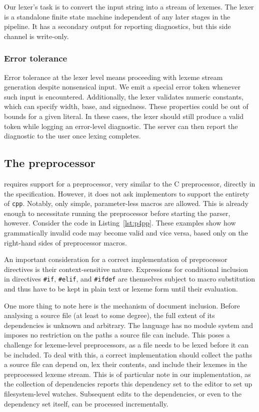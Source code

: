 Our lexer's task is to convert the input string into a stream of lexemes. The
lexer is a standalone finite state machine independent of any later stages in
the pipeline. It has a secondary output for reporting diagnostics, but this side
channel is write-only.

\subsubsection*{Error tolerance}

Error tolerance at the lexer level means proceeding with lexeme stream
generation despite nonsensical input. We emit a special error token whenever
such input is encountered. Additionally, the lexer validates numeric constants,
which can specify width, base, and signedness. These properties could be out of
bounds for a given literal. In these cases, the lexer should still produce a
valid token while logging an error-level diagnostic. The server can then report
the diagnostic to the user once lexing completes.


\subsection{The preprocessor}

\pfs requires support for a preprocessor, very similar to the C preprocessor,
directly in the specification. However, it does not ask implementors to support
the entirety of \texttt{cpp}. Notably, only simple, parameter-less macros are
allowed. This is already enough to necessitate running the preprocessor before
starting the parser, however. Consider the code in Listing~\ref{lst:p4pp}. These
examples show how grammatically invalid code may become valid and vice versa,
based only on the right-hand sides of preprocessor macros.

An important consideration for a correct implementation of preprocessor
directives is their context-sensitive nature. Expressions for conditional
inclusion in directives \texttt{\#if}, \texttt{\#elif}, and \texttt{\#ifdef} are
themselves subject to macro substitution and thus have to be kept in plain text
or lexeme form until their evaluation.

One more thing to note here is the mechanism of document inclusion. Before
analysing a \pfs source file (at least to some degree), the full extent of its
dependencies is unknown and arbitrary. The language has no module system and
imposes no restriction on the paths a source file can include. This poses a
challenge for lexeme-level preprocessors, as a file needs to be lexed before it
can be included. To deal with this, a correct implementation should collect the
paths a source file can depend on, lex their contents, and include their lexemes
in the preprocessed lexeme stream. This is of particular note in our
implementation, as the collection of dependencies reports this dependency set to
the editor to set up filesystem-level watches. Subsequent edits to the
dependencies, or even to the dependency set itself, can be processed
incrementally.

